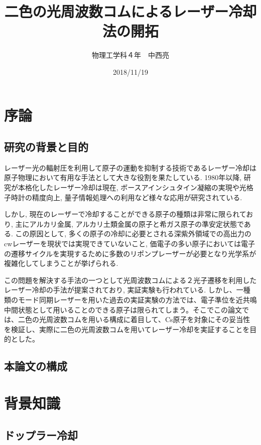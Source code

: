 \documentclass[uplatex, dvipdfmx, a4paper, report, papersize, 11pt]{jsbook}
\title{二色の光周波数コムによるレーザー冷却法の開拓}
\author{物理工学科４年　中西亮}
\date{2018/11/19}
\begin{document}
\maketitle
\newpage

\setcounter{tocdepth}{2}
\tableofcontents


\newpage
\chapter{序論}
\section{研究の背景と目的}
レーザー光の輻射圧を利用して原子の運動を抑制する技術であるレーザー冷却は原子物理において有用な手法として大きな役割を果たしている. 1980年以降, 研究が本格化したレーザー冷却は現在, ボースアインシュタイン凝縮の実現や光格子時計の精度向上, 量子情報処理への利用など様々な応用が研究されている. \cite{レーザー冷却とその応用}\par
しかし, 現在のレーザーで冷却することができる原子の種類は非常に限られており, 主にアルカリ金属, アルカリ土類金属の原子と希ガス原子の準安定状態である. \cite{PhysRevA.73.063407}この原因として, 多くの原子の冷却に必要とされる深紫外領域での高出力のcwレーザーを現状では実現できていないこと, 価電子の多い原子においては電子の遷移サイクルを実現するために多数のリポンプレーザーが必要となり光学系が複雑化してしまうことが挙げられる.\par
この問題を解決する手法の一つとして光周波数コムによる２光子遷移を利用したレーザー冷却の手法が提案されており, 実証実験も行われている\cite{PhysRevX.6.041004}\cite{PhysRevA.73.063407}. しかし、一種類のモード同期レーザーを用いた過去の実証実験の方法では、電子準位を近共鳴中間状態として用いることのできる原子は限られてしまう。そこでこの論文では、二色の光周波数コムを用いる構成に着目して、Cs原子を対象にその妥当性を検証し、実際に二色の光周波数コムを用いてレーザー冷却を実証することを目的とした。\\

\section{本論文の構成}

\newpage

\chapter{背景知識}

\section{ドップラー冷却}
\end{document}
